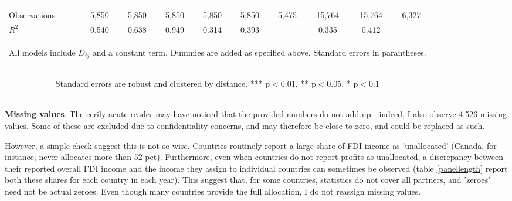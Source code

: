 \documentclass[twoside,a4paper,11pt]{article}
\begin{document}
\begin{table}
{\begin{tabular}{lccc|ccc|ccc}
			\vspace{4pt} & \begin{footnotesize}\end{footnotesize} & \begin{footnotesize}\end{footnotesize} & \begin{footnotesize}\end{footnotesize} & \begin{footnotesize}\end{footnotesize} & \begin{footnotesize}\end{footnotesize} & \begin{footnotesize}\end{footnotesize} & \begin{footnotesize}\end{footnotesize} & \begin{footnotesize}\end{footnotesize} & \begin{footnotesize}\end{footnotesize} \\
			Observations & 5,850 & 5,850 & 5,850 & 5,850 & 5,850 & 5,475 & 15,764 & 15,764 & 6,327 \\
			$R^2$ & 0.540 & 0.638 & 0.949 & 0.314 & 0.393 &  & 0.335 & 0.412 &  \\ \hline
			\multicolumn{10}{c}{\begin{footnotesize} All models include $ D_{ij}$ and a constant term. Dummies are added as specified above. Standard errors in parantheses.\end{footnotesize}} \\
			\multicolumn{10}{c}{\begin{footnotesize} Standard errors are robust and clustered by distance. *** p$<$0.01, ** p$<$0.05, * p$<$0.1\end{footnotesize}} \\
		\end{tabular}
	}
\end{table}

\textbf{Missing values}. The eerily acute reader may have noticed that the provided numbers do not add up - indeed, I also observe 4.526 missing values. Some of these are excluded due to confidentiality concerns, and may therefore be close to zero, and could be replaced as such. 

However, a simple check suggest this is not so wise. Countries routinely report a large share of FDI income as 'unallocated' (Canada, for instance, never allocates more than 52 pct). Furthermore, even when countries do not report profits as unallocated, a discrepancy between their reported overall FDI income and the income they assign to individual countries can sometimes be observed (table \ref{panellength} report both these shares for each country in each year). This suggest that, for some countries, statistics do not cover all partners, and 'zeroes' need not be actual zeroes. Even though many countries provide the full allocation, I do not reassign missing values. 
\end{document}
